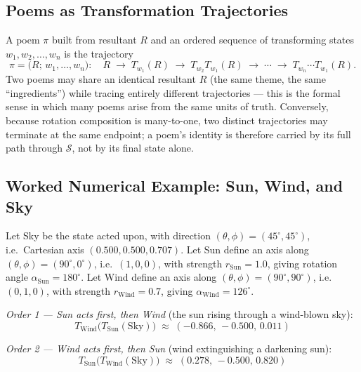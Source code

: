 \documentclass[12pt, a4paper]{article}
\begin{document}
\subsection{Poems as Transformation Trajectories}
\label{subsec:transform_trajectories}
A poem $\pi$ built from resultant $R$ and an ordered sequence of
transforming states $w_1, w_2, \ldots, w_n$ is the trajectory
\begin{equation}
    \pi = \big(R;\, w_1, \ldots, w_n\big): \quad
    R \;\longrightarrow\; T_{w_1}(R) \;\longrightarrow\; T_{w_2}T_{w_1}(R) \;\longrightarrow\; \cdots \;\longrightarrow\; T_{w_n}\cdots T_{w_1}(R).
    \label{eq:poem_trajectory}
\end{equation}
Two poems may share an identical resultant $R$ (the same theme, the
same ``ingredients'') while tracing entirely different trajectories
--- this is the formal sense in which many poems arise from the same
units of truth. Conversely, because rotation composition is
many-to-one, two distinct trajectories may terminate at the same
endpoint; a poem's identity is therefore carried by its full path
through $\mathcal{S}$, not by its final state alone.

\subsection{Worked Numerical Example: Sun, Wind, and Sky}
\label{subsec:transform_example}
Let Sky be the state acted upon, with direction
$(\theta,\phi) = (45^\circ, 45^\circ)$, i.e.\ Cartesian axis
$(0.500, 0.500, 0.707)$. Let Sun define an axis along
$(\theta,\phi) = (90^\circ, 0^\circ)$, i.e.\ $(1,0,0)$, with strength
$r_{\text{Sun}} = 1.0$, giving rotation angle $\alpha_{\text{Sun}} =
180^\circ$. Let Wind define an axis along $(\theta,\phi) = (90^\circ,
90^\circ)$, i.e.\ $(0,1,0)$, with strength $r_{\text{Wind}} = 0.7$,
giving $\alpha_{\text{Wind}} = 126^\circ$.

\emph{Order 1 --- Sun acts first, then Wind} (the sun rising through a
wind-blown sky):
\begin{equation}
    T_{\text{Wind}}\big(T_{\text{Sun}}(\text{Sky})\big) \;\approx\; (-0.866,\, -0.500,\, 0.011)
\end{equation}

\emph{Order 2 --- Wind acts first, then Sun} (wind extinguishing a
darkening sun):
\begin{equation}
    T_{\text{Sun}}\big(T_{\text{Wind}}(\text{Sky})\big) \;\approx\; (0.278,\, -0.500,\, 0.820)
\end{equation}
\end{document}
